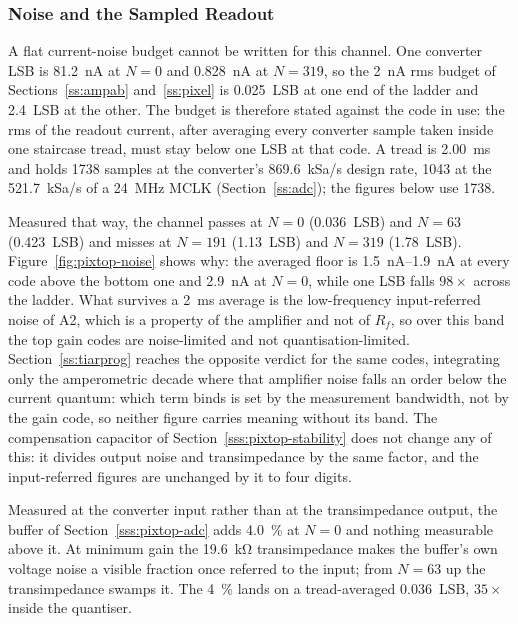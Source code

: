 \subsubsection{Noise and the Sampled Readout}\label{sss:pixtop-noise}

A flat current-noise budget cannot be written for this channel. One converter
LSB is \SI{81.2}{\nano\ampere} at \(N = 0\) and \SI{0.828}{\nano\ampere} at
\(N = 319\), so the \SI{2}{\nano\ampere} rms budget of
Sections~\ref{ss:ampab} and~\ref{ss:pixel} is \SI{0.025}{LSB} at one end of the
ladder and \SI{2.4}{LSB} at the other. The budget is therefore stated against the code in use: the rms of the
readout current, after averaging every converter sample taken inside one
staircase tread, must stay below one LSB at that code. A tread is
\SI{2.00}{\milli\second} and holds 1738 samples at the converter's
\SI{869.6}{kSa/s} design rate, 1043 at the \SI{521.7}{kSa/s} of a
\SI{24}{\mega\hertz} MCLK (Section~\ref{ss:adc}); the figures below use 1738.

Measured that way, the channel passes at \(N = 0\) (\SI{0.036}{LSB}) and
\(N = 63\) (\SI{0.423}{LSB}) and misses at \(N = 191\) (\SI{1.13}{LSB}) and
\(N = 319\) (\SI{1.78}{LSB}). Figure~\ref{fig:pixtop-noise} shows why: the
averaged floor is \SIrange{1.5}{1.9}{\nano\ampere} at every code above the
bottom one and \SI{2.9}{\nano\ampere} at \(N = 0\), while one LSB falls
\(98\times\) across the ladder. What survives a \SI{2}{\milli\second} average
is the low-frequency input-referred noise of A2, which is a property of the
amplifier and not of \(R_f\), so over this band the top gain codes are
noise-limited and not quantisation-limited. Section~\ref{ss:tiarprog} reaches
the opposite verdict for the same codes, integrating only the amperometric
decade where that amplifier noise falls an order below the current quantum:
which term binds is set by the measurement bandwidth, not by the gain code, so
neither figure carries meaning without its band. The
compensation capacitor of Section~\ref{sss:pixtop-stability} does not change
any of this: it divides output noise and transimpedance by the same factor, and
the input-referred figures are unchanged by it to four digits.

Measured at the converter input rather than at the transimpedance output, the
buffer of Section~\ref{sss:pixtop-adc} adds \SI{4.0}{\percent} at \(N = 0\) and
nothing measurable above it. At minimum gain the \SI{19.6}{\kilo\ohm}
transimpedance makes the buffer's own voltage noise a visible fraction once
referred to the input; from \(N = 63\) up the transimpedance swamps it. The
\SI{4}{\percent} lands on a tread-averaged \SI{0.036}{LSB}, \(35\times\) inside
the quantiser.

